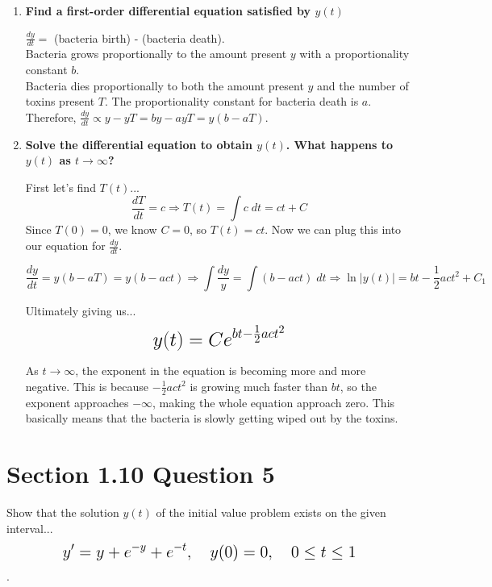 \documentclass[11pt]{article}
\begin{document}
 \begin{enumerate}[label=(\alph*)]

   \item \textbf{Find a first-order differential equation satisfied by $y(t)$}

     $\frac{dy}{dt} = $ (bacteria birth) - (bacteria death). \\
     Bacteria grows proportionally to the amount present $y$ with a proportionality 
     constant $b$. \\
     Bacteria dies proportionally to both the amount present $y$ and the number of 
     toxins present $T$.  The proportionality constant for bacteria death is $a$. \\
     Therefore, $\frac{dy}{dt} \propto y - yT = by - ayT = y(b - aT)$. \\

   \item \textbf{Solve the differential equation to obtain $y(t)$. What happens to
     $y(t)$ as $t \rightarrow \infty$?}

     First let's find $T(t)$...
     $$\frac{dT}{dt} = c \Rightarrow T(t) = \int c \; dt = ct + C$$
     Since $T(0) = 0$, we know $C = 0$, so $T(t) = ct$.  Now we can plug this into
     our equation for $\frac{dy}{dt}$.

     $$\frac{dy}{dt} = y(b-aT) = y(b-act) \Rightarrow \int \frac{dy}{y}
     = \int (b-act) \; dt \Rightarrow \ln{|y(t)|} = bt - \frac{1}{2}act^2 + C_1$$

     Ultimately giving us... 
     $$\mathlarger{\mathlarger{\mathlarger{y(t) = Ce^{bt - \frac{1}{2}act^2}}}}$$

     As $t \rightarrow \infty$, the exponent in the equation is becoming more and 
     more negative.  This is because $-\frac{1}{2}act^2$ is growing much faster than
     $bt$, so the exponent approaches $-\infty$, making the whole equation approach 
     zero.  This basically means that the bacteria is slowly getting wiped out by the
     toxins.

 \end{enumerate}

 \section*{Section 1.10 Question 5}
 Show that the solution $y(t)$ of the initial value problem exists on the given
 interval... 
 $$\mathlarger{\mathlarger{
   y' = y + e^{-y} + e^{-t}, \quad y(0) = 0, \quad 0 \leq t \leq 1
 }}$$.
\end{document}
